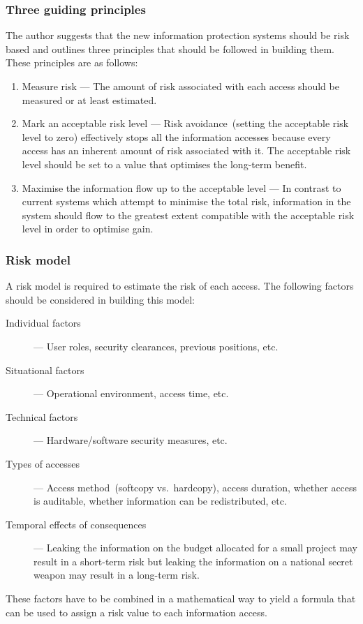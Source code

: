 \subsubsection{Three guiding principles}
\label{sec:ebsprinciples}
The author suggests that the new information protection systems should
be risk based and outlines three principles that should be followed in
building them. These principles are as follows:
\begin{enumerate}
\item Measure risk --- The amount of risk associated with each
  access should be measured or at least estimated.
\item Mark an acceptable risk level --- Risk avoidance~(setting the
  acceptable risk level to zero) effectively stops all the information
  accesses because every access has an inherent amount of risk
  associated with it. The acceptable risk level should be set to a
  value that optimises the long-term benefit.
\item Maximise the information flow up to the acceptable level --- In
  contrast to current systems which attempt to minimise the total
  risk, information in the system should flow to the greatest extent
  compatible with the acceptable risk level in order to optimise gain.
\end{enumerate}

\subsubsection{Risk model}
\label{sec:ebsriskmodel}
A risk model is required to estimate the risk of each access. The
following factors should be considered in building this model:
\begin{description}
\item [Individual factors] --- User roles, security clearances,
  previous positions, etc.
\item [Situational factors] --- Operational environment,
  access time, etc.
\item [Technical factors] --- Hardware/software security measures,
  etc.
\item [Types of accesses] --- Access method~(softcopy vs.\ hardcopy),
  access duration, whether access is auditable, whether information
  can be redistributed, etc.
\item [Temporal effects of consequences] --- Leaking the information
  on the budget allocated for a small project may result in a
  short-term risk but leaking the information on a national secret
  weapon may result in a long-term risk.
\end{description}
These factors have to be combined in a mathematical way to yield a
formula that can be used to assign a risk value to each information
access.

